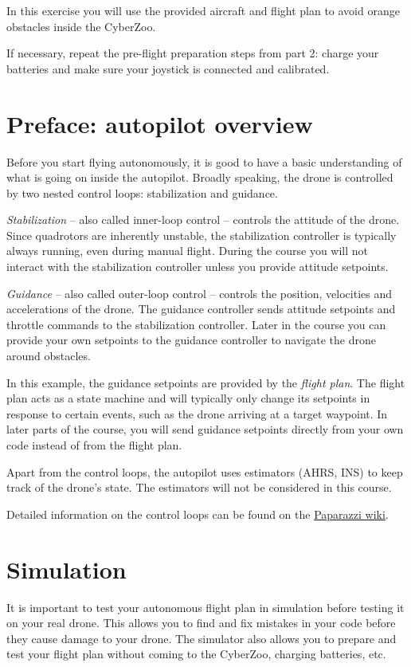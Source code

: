 \documentclass{article}
\begin{document}

In this exercise you will use the provided aircraft and flight plan to avoid orange obstacles inside the CyberZoo.

If necessary, repeat the pre-flight preparation steps from part 2: charge your batteries and make sure your joystick is connected and calibrated.


\section{Preface: autopilot overview}
Before you start flying autonomously, it is good to have a basic understanding of what is going on inside the autopilot. Broadly speaking, the drone is controlled by two nested control loops: stabilization and guidance.

\emph{Stabilization} -- also called inner-loop control -- controls the attitude of the drone. Since quadrotors are inherently unstable, the stabilization controller is typically always running, even during manual flight. During the course you will not interact with the stabilization controller unless you provide attitude setpoints.

\emph{Guidance} -- also called outer-loop control -- controls the position, velocities and accelerations of the drone. The guidance controller sends attitude setpoints and throttle commands to the stabilization controller. Later in the course you can provide your own setpoints to the guidance controller to navigate the drone around obstacles.

In this example, the guidance setpoints are provided by the \emph{flight plan}. The flight plan acts as a state machine and will typically only change its setpoints in response to certain events, such as the drone arriving at a target waypoint. In later parts of the course, you will send guidance setpoints directly from your own code instead of from the flight plan.

Apart from the control loops, the autopilot uses estimators (AHRS, INS) to keep track of the drone's state. The estimators will not be considered in this course.

Detailed information on the control loops can be found on the \href{http://wiki.paparazziuav.org/wiki/Control_Loops#Rotorcraft_autopilot}{Paparazzi wiki}.




\section{Simulation}
It is important to test your autonomous flight plan in simulation before testing it on your real drone. This allows you to find and fix mistakes in your code before they cause damage to your drone. The simulator also allows you to prepare and test your flight plan without coming to the CyberZoo, charging batteries, etc.
\end{document}
